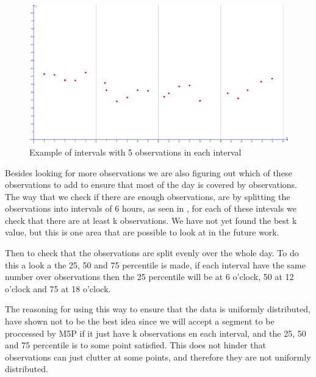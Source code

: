 \begin{figure}
\centering
\includegraphics[width=\textwidth]{figures/intervals.png}
\caption{Example of intervals with 5 observations in each interval}
\label{fig:intervals}
\end{figure}

Besides looking for more observations we are also figuring out which of these observations to add to ensure that most of the day is covered by observations. The way that we check if there are enough observations, are by splitting the observations into intervals of 6 hours, as seen in , for each of these intevals we check that there are at least k observations. We have not yet found the best k value, but this is one area that are possible to look at in the future work.

Then to check that the observations are split evenly over the whole day. To do this a look a the 25, 50 and 75 percentile is made, if each interval have the same number over observations then the 25 percentile will be at 6 o'clock, 50 at 12 o'clock and 75 at 18 o'clock.

The reasoning for using this way to ensure that the data is uniformly distributed, have shown not to be the best idea since we will accept a segment to be proccessed by M5P if it just have k observations en each interval, and the 25, 50 and 75 percentile is to some point satisfied. This does not hinder that observations can just clutter at some points, and therefore they are not uniformly distributed.

